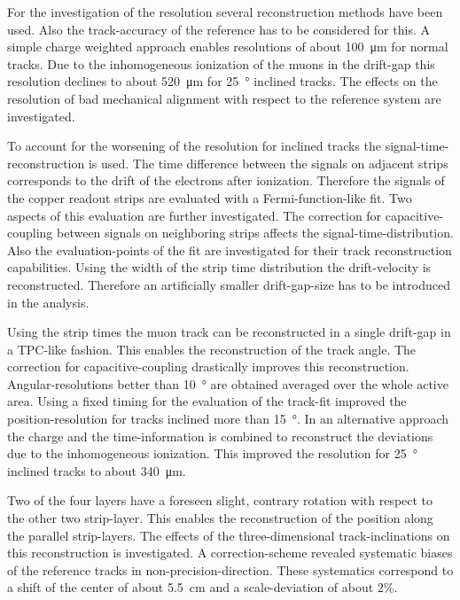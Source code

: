 \documentclass[
twoside,            %
BCOR1.4cm,          %
10pt,               %
headings=normal,    %
headsepline,        %
clearplainpage,		%
final,              %
div=14,
open=right,
bibliography=toc
]{scrreprt}
\begin{document}
For the investigation of the resolution several reconstruction methods have been used.
Also the track-accuracy of the reference has to be considered for this.
A simple charge weighted approach enables resolutions of about \SI{100}{\micro\m} for normal tracks.
Due to the inhomogeneous ionization of the muons in the drift-gap this resolution declines to about \SI{520}{\micro\m} for \SI{25}{\degree} inclined tracks.
The effects on the resolution of bad mechanical alignment with respect to the reference system are investigated.

To account for the worsening of the resolution for inclined tracks the signal-time-reconstruction is used.
The time difference between the signals on adjacent strips corresponds to the drift of the electrons after ionization.
Therefore the signals of the copper readout strips are evaluated with a Fermi-function-like fit.
Two aspects of this evaluation are further investigated.
The correction for capacitive-coupling between signals on neighboring strips affects the signal-time-distribution.
Also the evaluation-points of the fit are investigated for their track reconstruction capabilities.
Using the width of the strip time distribution the drift-velocity is reconstructed.
Therefore an artificially smaller drift-gap-size has to be introduced in the analysis.

Using the strip times the muon track can be reconstructed in a single drift-gap in a TPC-like fashion.
This enables the reconstruction of the track angle.
The correction for capacitive-coupling drastically improves this reconstruction.
Angular-resolutions better than \SI{10}{\degree} are obtained averaged over the whole active area.
Using a fixed timing for the evaluation of the track-fit improved the position-resolution for tracks inclined more than \SI{15}{\degree}.
In an alternative approach the charge and the time-information is combined to reconstruct the deviations due to the inhomogeneous ionization.
This improved the resolution for \SI{25}{\degree} inclined tracks to about \SI{340}{\micro\m}.

Two of the four layers have a foreseen slight, contrary rotation with respect to the other two strip-layer.
This enables the reconstruction of the position along the parallel strip-layers.
The effects of the three-dimensional track-inclinations on this reconstruction is investigated.
A correction-scheme revealed systematic biases of the reference tracks in non-precision-direction.
These systematics correspond to a shift of the center of about \SI{5.5}{cm} and a scale-deviation of about 2\%.
\end{document}
